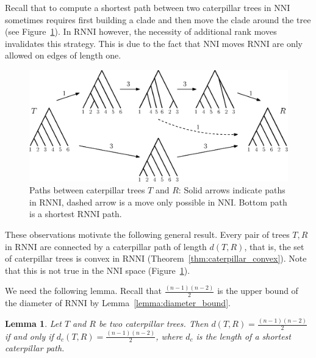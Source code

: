 \documentclass{amsart}
\newcommand{\nni}{\mathrm{NNI}}
\newcommand{\rnni}{\mathrm{RNNI}}
\newtheorem{lemma}[definition]{Lemma}
\begin{document}
Recall \autocite{Gavryushkin2018-ol} that to compute a shortest path between two caterpillar trees in $\nni$ sometimes requires first building a clade and then move the clade around the tree (see Figure~\ref{fig:NNI_vs_RNNI}).
In $\rnni$ however, the necessity of additional rank moves invalidates this strategy.
This is due to the fact that $\nni$ moves $\rnni$ are only allowed on edges of length one.

\begin{figure}[H]
\centering
\includegraphics[width=\textwidth]{NNI_vs_RNNI}
\vspace{12pt}
\caption{Paths between caterpillar trees $T$ and $R$: Solid arrows indicate paths in $\rnni$, dashed arrow is a move only possible in $\nni$.
Bottom path is a shortest $\rnni$ path.}
\label{fig:NNI_vs_RNNI}
\end{figure}

These observations motivate the following general result.
Every pair of trees $T, R$ in $\rnni$ are connected by a caterpillar path of length $d(T,R)$, that is, the set of caterpillar trees is convex in $\rnni$ (Theorem~\ref{thm:caterpillar_convex}).
Note that this is not true in the $\nni$ space (Figure~\ref{fig:NNI_vs_RNNI}).

We need the following lemma.
Recall that $\frac{(n-1)(n-2)}{2}$ is the upper bound of the diameter of $\rnni$ by Lemma~\ref{lemma:diameter_bound}.

\begin{lemma}
Let $T$ and $R$ be two caterpillar trees.
Then $d(T,R) = \frac{(n-1)(n-2)}{2}$ if and only if $d_c(T,R) = \frac{(n-1)(n-2)}{2}$, where $d_c$ is the length of a shortest caterpillar path.
\label{lemma:caterpillar_dist=diameter}
\end{lemma}
\end{document}
